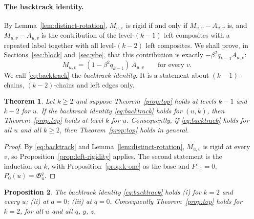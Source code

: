 \documentclass[11pt]{article}
\newtheorem{proposition}{Proposition}
\newtheorem{theorem}[proposition]{Theorem}
\newcommand{\G}{\mathfrak{G}}
\begin{document}
\paragraph{The backtrack identity.}
By Lemma~\ref{lem:distinct-rotation}, $M_{u,v}$ is rigid if and only if
$M_{u,v}-A_{u,v}$ is, and $M_{u,v}-A_{u,v}$ is the contribution of the
level-$(k-1)$ left composites with a repeated label together with all
level-$(k-2)$ left composites. We shall prove, in
Sections~\ref{sec:block} and~\ref{sec:ybe}, that this contribution is
exactly $-\beta^2q_{k-1}A_{u,v}$:
\begin{equation}\label{eq:backtrack}
 M_{u,v}=(1-\beta^2q_{k-1})\,A_{u,v}
 \qquad\text{for every }v .
\end{equation}
We call \eqref{eq:backtrack} the \emph{backtrack identity}. It is a
statement about $(k-1)$-chains, $(k-2)$-chains and left edges only.

\begin{theorem}\label{thm:backtrack-implies}
Let $k\geq2$ and suppose Theorem~\ref{prop:top} holds at levels $k-1$
and $k-2$ for $u$. If the backtrack identity \eqref{eq:backtrack}
holds for $(u,k)$, then Theorem~\ref{prop:top} holds at level $k$ for
$u$. Consequently, if \eqref{eq:backtrack} holds for all $u$ and all
$k\geq2$, then Theorem~\ref{prop:top} holds in general.
\end{theorem}

\begin{proof}
By \eqref{eq:backtrack} and Lemma~\ref{lem:distinct-rotation},
$M_{u,v}$ is rigid at every $v$, so
Proposition~\ref{prop:left-rigidity} applies. The second statement is
the induction on $k$, with Proposition~\ref{prop:k-one} as the base
and $P_{-1}=0$, $P_0(u)=\G^q_u$.
\end{proof}

\begin{proposition}\label{prop:backtrack-known}
The backtrack identity \eqref{eq:backtrack} holds (i) for $k=2$ and
every $u$; (ii) at $a=0$; (iii) at $q=0$. Consequently
Theorem~\ref{prop:top} holds for $k=2$, for all $u$ and all $q$, $y$,
$z$.
\end{proposition}
\end{document}
